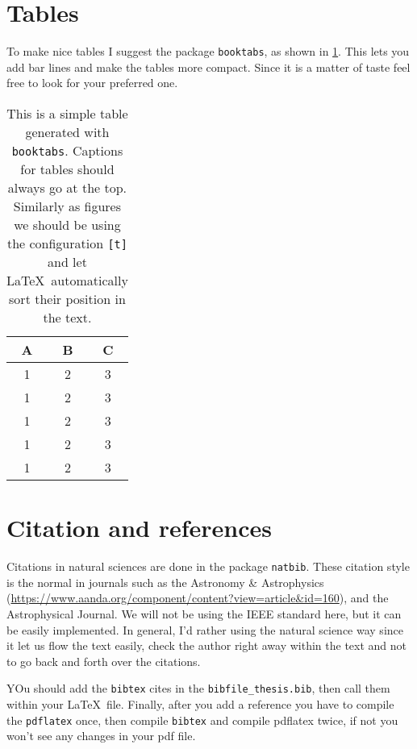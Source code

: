 \section{Tables}

To make nice tables I suggest the package \texttt{booktabs}, as shown in \cref{tab:my_table}. This lets you add bar lines and make the tables more compact. Since it is a matter of taste feel free to look for your preferred one.

\begin{table}[t]
  \centering
  \caption[My first table]{This is a simple table generated with \texttt{booktabs}. Captions for tables should always go at the top. Similarly as figures we should be using the configuration \texttt{[t]} and let \LaTeX\ automatically sort their position in the text.}
  \label{tab:my_table}
  \begin{tabular}{ccc}
    \toprule
    \textbf{A} & \textbf{B} & \textbf{C} \\ \midrule
    1 & 2 & 3 \\
    1 & 2 & 3 \\
    1 & 2 & 3 \\
    1 & 2 & 3 \\
    1 & 2 & 3 \\
    \bottomrule
  \end{tabular}
\end{table}

\section{Citation and references}

Citations in natural sciences are done in the package \texttt{natbib}. These citation style is the normal in journals such as the Astronomy \& Astrophysics (\url{https://www.aanda.org/component/content?view=article&id=160}), and the Astrophysical Journal. We will not be using the IEEE standard here, but it can be easily implemented. In general, I'd rather using the natural science way since it let us flow the text easily, check the author right away within the text and not to go back and forth over the citations.

YOu should add the \texttt{bibtex} cites in the \texttt{bibfile\_thesis.bib}, then call them within your \LaTeX\ file. Finally, after you add a reference you have to compile the \texttt{pdflatex} once, then compile \texttt{bibtex} and compile pdflatex twice, if not you won't see any changes in your pdf file.

